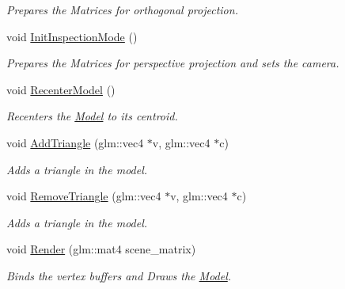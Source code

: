 \begin{DoxyCompactItemize}
\begin{DoxyCompactList}\small\item\em Prepares the Matrices for orthogonal projection. \end{DoxyCompactList}\item 
void \hyperlink{classcft_1_1Model_ace7b42bc64fdc1e7f41bb1d0b6e125c1}{Init\+Inspection\+Mode} ()\hypertarget{classcft_1_1Model_ace7b42bc64fdc1e7f41bb1d0b6e125c1}{}\label{classcft_1_1Model_ace7b42bc64fdc1e7f41bb1d0b6e125c1}

\begin{DoxyCompactList}\small\item\em Prepares the Matrices for perspective projection and sets the camera. \end{DoxyCompactList}\item 
void \hyperlink{classcft_1_1Model_a3199cede29c78675f69fc7d589667218}{Recenter\+Model} ()\hypertarget{classcft_1_1Model_a3199cede29c78675f69fc7d589667218}{}\label{classcft_1_1Model_a3199cede29c78675f69fc7d589667218}

\begin{DoxyCompactList}\small\item\em Recenters the \hyperlink{classcft_1_1Model}{Model} to its centroid. \end{DoxyCompactList}\item 
void \hyperlink{classcft_1_1Model_aab5427ba9dbd7694c8b42453b63ac157}{Add\+Triangle} (glm\+::vec4 $\ast$v, glm\+::vec4 $\ast$c)
\begin{DoxyCompactList}\small\item\em Adds a triangle in the model. \end{DoxyCompactList}\item 
void \hyperlink{classcft_1_1Model_ac706c44d6bb864ca80449e963f9dbc22}{Remove\+Triangle} (glm\+::vec4 $\ast$v, glm\+::vec4 $\ast$c)
\begin{DoxyCompactList}\small\item\em Adds a triangle in the model. \end{DoxyCompactList}\item 
void \hyperlink{classcft_1_1Model_ac8465027b499db36cf5b478b9394348f}{Render} (glm\+::mat4 scene\+\_\+matrix)\hypertarget{classcft_1_1Model_ac8465027b499db36cf5b478b9394348f}{}\label{classcft_1_1Model_ac8465027b499db36cf5b478b9394348f}

\begin{DoxyCompactList}\small\item\em Binds the vertex buffers and Draws the \hyperlink{classcft_1_1Model}{Model}. \end{DoxyCompactList}\end{DoxyCompactItemize}
